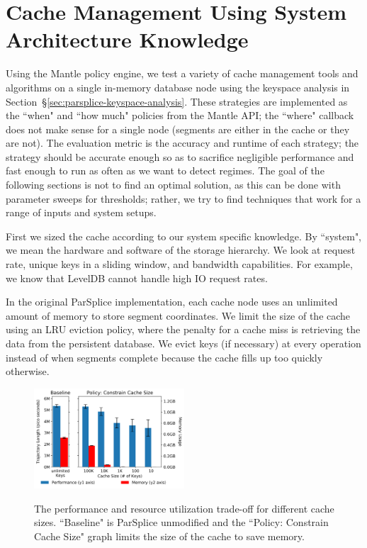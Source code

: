 \section{Cache Management Using System Architecture Knowledge}
\label{sec:cache-management-using-system-archiecture-knowledge}

Using the Mantle policy engine, we test a variety of cache management tools and
algorithms on a single in-memory database node using the keyspace analysis in
Section~\S\ref{sec:parsplice-keyspace-analysis}. These strategies are
implemented as the ``when" and ``how much" policies from the Mantle API; the
``where" callback does not make sense for a single node (segments are either in
the cache or they are not). The evaluation metric is the accuracy and runtime
of each strategy; the strategy should be accurate enough so as to sacrifice
negligible performance and fast enough to run as often as we want to detect
regimes. The goal of the following sections is not to find an optimal solution,
as this can be done with parameter sweeps for thresholds; rather, we try to
find techniques that work for a range of inputs and system setups.

First we sized the cache according to our system specific knowledge. By
``system", we mean the hardware and software of the storage hierarchy. We look
at request rate, unique keys in a sliding window, and bandwidth capabilities. For
example, we know that LevelDB cannot handle high IO request rates.

In the original ParSplice implementation, each cache node uses an unlimited
amount of memory to store segment coordinates. We limit the size of the cache
using an LRU eviction policy, where the penalty for a cache miss is retrieving
the data from the persistent database.  We evict keys (if necessary) at every
operation instead of when segments complete because the cache fills up too
quickly otherwise.

\begin{figure}[t]
  \noindent\includegraphics[width=0.5\textwidth]{figures/methodology-tradeoff.png}\\
  \caption{The performance and resource utilization trade-off for different
  cache sizes. ``Baseline" is
  ParSplice unmodified and the ``Policy: Constrain Cache Size" graph limits the
  size of the cache to save memory.  \label{fig:methodology-tradeoff}}
\end{figure}

